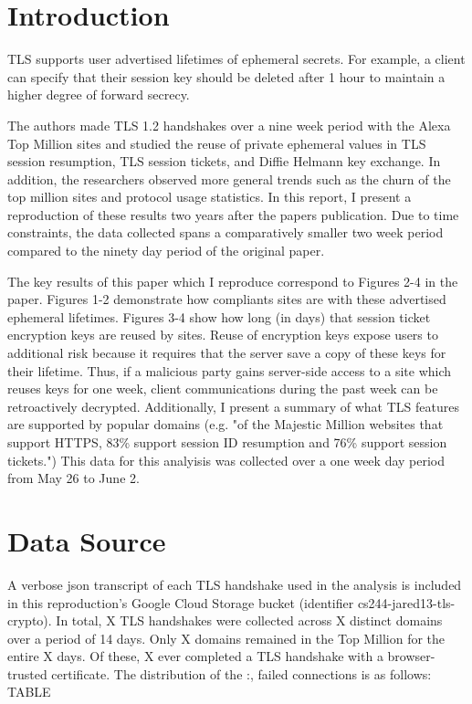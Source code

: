 \section{Introduction}

TLS supports user advertised lifetimes of ephemeral secrets. For example, a client can specify that their session key should be deleted after 1 hour to maintain a higher degree of forward secrecy.

The authors made TLS 1.2 handshakes over a nine week period with the Alexa Top Million sites and studied the reuse of private ephemeral values in TLS session resumption, TLS session tickets, and Diffie Helmann key exchange. In addition, the researchers observed more general trends such as the churn of the top million sites and protocol usage statistics. In this report, I present a reproduction of these results two years after the papers publication. Due to time constraints, the data collected spans a comparatively smaller two week period compared to the ninety day period of the original paper.

The key results of this paper which I reproduce correspond to Figures 2-4 in the paper.  Figures 1-2 demonstrate how compliants sites are with these advertised ephemeral lifetimes. Figures 3-4 show how long (in days) that session ticket encryption keys are reused by sites. Reuse of encryption keys expose users to additional risk because it requires that the server save a copy of these keys for their lifetime. Thus, if a malicious party gains server-side access to a site which reuses keys for one week, client communications during the past week can be retroactively decrypted. Additionally, I present a summary of what TLS features are supported by popular domains (e.g. "of the Majestic Million websites that support HTTPS, 83\% support session ID resumption and 76\% support session tickets.") This data for this analyisis was collected over a one week day period from May 26 to June 2.

\section{Data Source}
A verbose json transcript of each TLS handshake used in the analysis is included in this reproduction's Google Cloud Storage bucket (identifier cs244-jared13-tls-crypto). In total, X TLS handshakes were collected across X distinct domains over a period of 14 days. Only X domains remained in the Top Million for the entire X days. Of these, X ever completed a TLS handshake with a browser-trusted certificate. The distribution of the {:,} failed connections is as follows: TABLE


